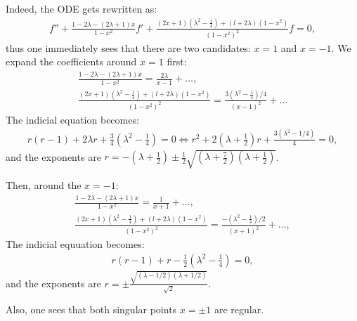 \documentclass{article}
\begin{document}
Indeed, the ODE gets rewritten as:
\begin{eqnarray}
  & f'' + \frac{1 - 2 \lambda - (2 \lambda + 1) x}{1 - x^2} f' + \frac{(2 x +
  1) \left( \lambda^2 - \frac{1}{4} \right) + (l + 2 \lambda) (1 - x^2)}{(1 -
  x^2)^2} f = 0, &  \nonumber
\end{eqnarray}
thus one immediately sees that there are two candidates: $x = 1$ and $x = -
1$. We expand the coefficients around $x = 1$ first:
\begin{eqnarray}
  & \frac{1 - 2 \lambda - (2 \lambda + 1) x}{1 - x^2} = \frac{2 \lambda}{x -
  1} + \ldots, &  \nonumber\\
  & \frac{(2 x + 1) \left( \lambda^2 - \frac{1}{4} \right) + (l + 2 \lambda)
  (1 - x^2)}{(1 - x^2)^2} = \frac{3 \left( \lambda^2 - \frac{1}{4} \right) /
  4}{(x - 1)^2} + \ldots &  \nonumber
\end{eqnarray}
The indicial equation becomes:
\begin{eqnarray}
  & r (r - 1) + 2 \lambda r + \frac{3}{4} \left( \lambda^2 - \frac{1}{4}
  \right) = 0 \Leftrightarrow r^2 + 2 \left( \lambda + \frac{1}{2} \right) r +
  \frac{3 (\lambda^2 - 1 / 4)}{4} = 0, &  \nonumber
\end{eqnarray}
and the exponents are $r = - \left( \lambda + \frac{1}{2} \right) \pm
\frac{1}{2} \sqrt{\left( \lambda + \frac{7}{2} \right) \left( \lambda +
\frac{1}{2} \right)}$.

Then, around the $x = - 1$:
\begin{eqnarray}
  & \frac{1 - 2 \lambda - (2 \lambda + 1) x}{1 - x^2} = \frac{1}{x + 1} +
  \ldots, &  \nonumber\\
  & \frac{(2 x + 1) \left( \lambda^2 - \frac{1}{4} \right) + (l + 2 \lambda)
  (1 - x^2)}{(1 - x^2)^2} = \frac{- \left( \lambda^2 - \frac{1}{4} \right) /
  2}{(x + 1)^2} + \ldots, &  \nonumber
\end{eqnarray}
The indicial equuation becomes:
\begin{eqnarray}
  & r (r - 1) + r - \frac{1}{2} \left( \lambda^2 - \frac{1}{4} \right) = 0, &
  \nonumber
\end{eqnarray}
and the exponents are $r = \pm \frac{\sqrt{(\lambda - 1 / 2) (\lambda + 1 /
2)}}{\sqrt{2}}$.

Also, one sees that both singular points $x = \pm 1$ are regular.
\end{document}
